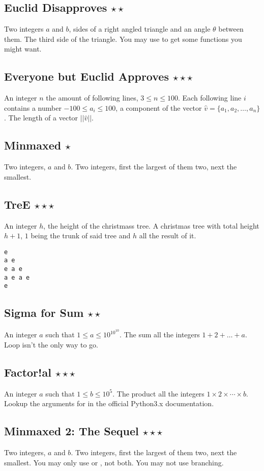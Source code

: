 \subsection{Euclid Disapproves $\star\star$}
\In
Two integers $a$ and $b$, sides of a right angled triangle and an angle $\theta$
between them.
\Out
The third side of the triangle.
\Hint
You may use  to get some functions you might want.

\subsection{Everyone but Euclid Approves $\star\star\star$}
\In
An integer $n$ the amount of following lines, $3 \leq n \leq 100$. 
Each following line $i$ contains a number $-100 \leq a_i \leq 100$, a 
component of the vector $\hat{v} = \{a_1, a_2, \dots, a_n\}$.
\Out
The length of a vector $||\hat{v}||$.

\subsection{Minmaxed $\star$}
\In
Two integers, $a$ and $b$.
\Out
Two integers, first the largest of them two, next the smallest.

\subsection{TreE $\star\star\star$}
\In
An integer $h$, the height of the christmass tree.
\Out
A christmas tree with total height $h + 1$, $1$ being the trunk of said
tree and $h$ all the result of it.
\begin{verbatim}
e
a e
e a e 
a e a e
e
\end{verbatim}

\subsection{Sigma for Sum $\star\star$}
\In
An integer $a$ such that $1 \leq a \leq 10^{10^{10}}$.
\Out
The sum all the integers $1 + 2 + \dots + a$.
\Hint
Loop isn't the only way to go.

\subsection{Factor!al $\star\star\star$}
\In
An integer $a$ such that $1 \leq b \leq 10^{5}$.
\Out
The product all the integers $1 \times 2 \times \cdots \times b$.
\Hint
Lookup the arguments for  in the official Python3.x documentation.

\subsection{Minmaxed 2: The Sequel $\star\star\star$}
\In
Two integers, $a$ and $b$.
\Out
Two integers, first the largest of them two, next the smallest.
\Note
You may  only use  or , not both. You may not use branching.
